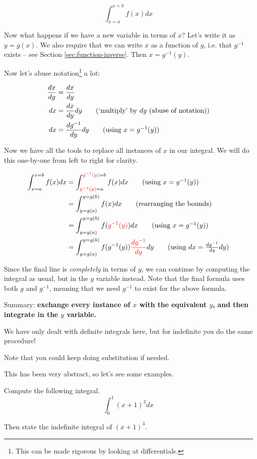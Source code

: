 \[ \int_{x=a}^{x=b} f(x) dx\]

Now what happens if we have a new variable in terms of $x$? Let's write it as $y = g(x)$. 
We also require that we can write $x$ as a function of $y$, 
i.e. that $g^{-1}$ exists -- see Section \ref{sec:function-inverse}.
Then $x = g^{-1}(y)$.

Now let's abuse notation\footnote{This can be made rigorous by looking at differentials.} a lot:

\begin{align*}
    \frac{dx}{dy} &= \frac{dx}{dy} \\
    dx &= \frac{dx}{dy} dy \tag{`multiply' by $dy$ (abuse of notation)} \\
    dx &= \frac{dg^{-1}}{dy} dy \tag{using $x = g^{-1}(y)$} 
\end{align*}

Now we have all the tools to replace all instances of $x$ in our integral. We will do this one-by-one from left to right for clarity.

\begin{align*}
    \int_{x=a}^{x=b} f(x) dx &=  \int_{\textcolor{red}{g^{-1}(y)}=a}^{\textcolor{red}{g^{-1}(y)}=b} f(x) dx \tag{using $x = g^{-1}(y)$}\\
    &=  \int_{y=g(a)}^{y=g(b)} f(x) dx \tag{rearranging the bounds} \\
    &= \int_{y=g(a)}^{y=g(b)} f(\textcolor{red}{g^{-1}(y)}) dx \tag{using $x = g^{-1}(y)$} \\
    &= \int_{y=g(a)}^{y=g(b)} f(g^{-1}(y)) \textcolor{red}{\frac{dg^{-1}}{dy}} dy\tag{using $dx = \frac{dg^{-1}}{dy} dy$}
\end{align*} 

Since the final line is \emph{completely} in terms of $y$, we can continue by computing the integral as usual, but in the $y$ variable instead. 
Note that the final formula uses both $g$ and $g^{-1}$, meaning that we need $g^{-1}$ to exist for the above formula.

Summary: \textbf{exchange every instance of $x$ with the equivalent $y$, and then integrate in the $y$ variable.}

We have only dealt with definite integrals here, but for indefinite you do the same procedure!

Note that you could keep doing substitution if needed.

This has been very abstract, so let's see some examples.

\begin{example}
    Compute the following integral.
    \[ \int_{0}^{1} (x+1)^3 dx \]

    Then state the indefinite integral of $(x+1)^3$.
\end{example}

